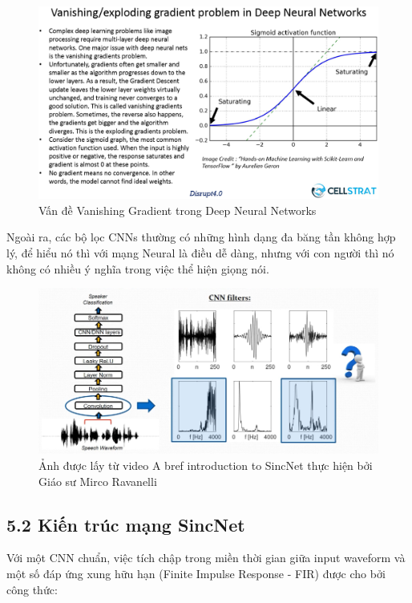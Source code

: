 \documentclass{article}
\begin{document}
	\begin{figure}[H]
		\centering
		\includegraphics[width=1\textwidth]{images/Vanishing-Gradients-in-DNN.png}
		\caption{Vấn đề Vanishing Gradient trong Deep Neural Networks}
		\label{fig:writing-thesis}
	\end{figure}
	Ngoài ra, các bộ lọc CNNs thường có những hình dạng đa băng tần không hợp lý, để hiểu nó thì với mạng Neural là điều dễ dàng, nhưng với con người thì nó không có nhiều ý nghĩa trong việc thể hiện giọng nói.
	\begin{figure}[H]
		\centering
		\includegraphics[width=1\textwidth]{images/interpretability_problems.png}
		\caption{Ảnh được lấy từ video A bref introduction to SincNet thực hiện bởi Giáo sư Mirco Ravanelli}
		\label{fig:writing-thesis}
	\end{figure}
	
	
	\subsection{5.2 Kiến trúc mạng SincNet}
	
	Với một CNN chuẩn, việc tích chập trong miền thời gian giữa input waveform và một số đáp ứng xung hữu hạn (Finite Impulse Response - FIR) được cho bởi công thức:
	
\end{document}
